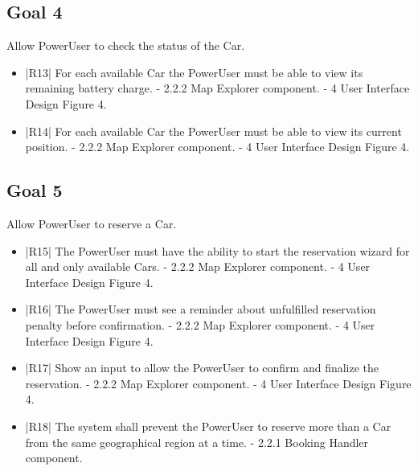 \subsection {Goal 4} Allow PowerUser to check the status of the Car.
\begin{itemize}
 \item |R13| For each available Car the PowerUser must be able to view its remaining
battery charge.
    \newline - 2.2.2 Map Explorer component.
    \newline - 4 User Interface Design Figure 4.
 \item |R14| For each available Car the PowerUser must be able to view its current position.
    \newline - 2.2.2 Map Explorer component.
    \newline - 4 User Interface Design Figure 4.
\end{itemize}

\subsection {Goal 5} Allow PowerUser to reserve a Car.
\begin{itemize}
 \item |R15| The PowerUser must have the ability to start the reservation wizard for all
and only available Cars.
    \newline - 2.2.2 Map Explorer component.
    \newline - 4 User Interface Design Figure 4.
 \item |R16| The PowerUser must see a reminder about unfulfilled reservation penalty before
confirmation.
    \newline - 2.2.2 Map Explorer component.
    \newline - 4 User Interface Design Figure 4.
 \item |R17| Show an input to allow the PowerUser to confirm and finalize the reservation.
    \newline - 2.2.2 Map Explorer component.
    \newline - 4 User Interface Design Figure 4.
 \item |R18| The system shall prevent the PowerUser to reserve more than a Car from the same geographical region at a time.
    \newline - 2.2.1 Booking Handler component.
\end{itemize}

